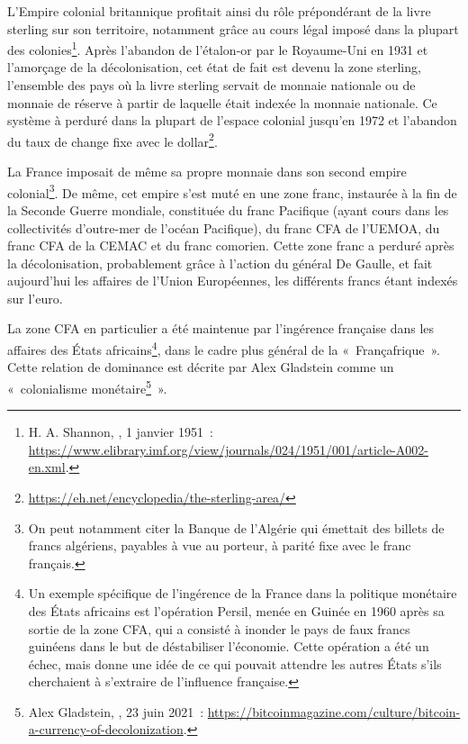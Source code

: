 L'Empire colonial britannique profitait ainsi du rôle prépondérant de la livre sterling sur son territoire, notamment grâce au cours légal imposé dans la plupart des colonies\footnote{H. A. Shannon, , 1\ier{} janvier 1951~: \url{https://www.elibrary.imf.org/view/journals/024/1951/001/article-A002-en.xml}.}. Après l'abandon de l'étalon-or par le Royaume-Uni en 1931 et l'amorçage de la décolonisation, cet état de fait est devenu la zone sterling, l'ensemble des pays où la livre sterling servait de monnaie nationale ou de monnaie de réserve à partir de laquelle était indexée la monnaie nationale. Ce système à perduré dans la plupart de l'espace colonial jusqu'en 1972 et l'abandon du taux de change fixe avec le dollar\footnote{\url{https://eh.net/encyclopedia/the-sterling-area/}}.

La France imposait de même sa propre monnaie dans son second empire colonial\footnote{On peut notamment citer la Banque de l'Algérie qui émettait des billets de francs algériens, payables à vue au porteur, à parité fixe avec le franc français.}. De même, cet empire s'est muté en une zone franc, instaurée à la fin de la Seconde Guerre mondiale, constituée du franc Pacifique (ayant cours dans les collectivités d'outre-mer de l'océan Pacifique), du franc CFA de l'UEMOA, du franc CFA de la CEMAC et du franc comorien. Cette zone franc a perduré après la décolonisation, probablement grâce à l'action du général De Gaulle, et fait aujourd'hui les affaires de l'Union Européennes, les différents francs étant indexés sur l'euro.

La zone CFA en particulier a été maintenue par l'ingérence française dans les affaires des États africains\footnote{Un exemple spécifique de l'ingérence de la France dans la politique monétaire des États africains est l'opération Persil, menée en Guinée en 1960 après sa sortie de la zone CFA, qui a consisté à inonder le pays de faux francs guinéens dans le but de déstabiliser l'économie. Cette opération a été un échec, mais donne une idée de ce qui pouvait attendre les autres États s'ils cherchaient à s'extraire de l'influence française.}, dans le cadre plus général de la «~Françafrique~». Cette relation de dominance est décrite par Alex Gladstein comme un «~colonialisme monétaire\footnote{Alex Gladstein, , 23 juin 2021~: \url{https://bitcoinmagazine.com/culture/bitcoin-a-currency-of-decolonization}.}~». %

